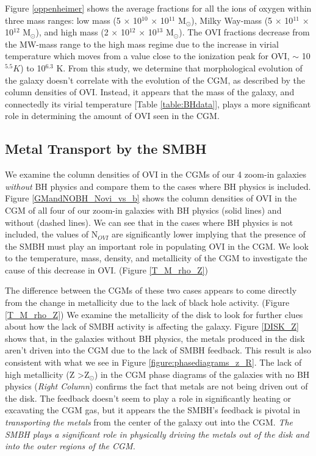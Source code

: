 \documentclass[]{emulateapj}
\begin{document}
Figure \ref{oppenheimer} shows the average fractions for all the ions of oxygen within three mass ranges: low mass (5 $\times$ 10$^{10}$  $\times$ 10$^{11}$ M$_{\odot}$), Milky Way-mass (5 $\times$ 10$^{11}$  $\times$ 10$^{12}$ M$_{\odot}$), and high mass (2 $\times$ 10$^{12}$  $\times$ 10$^{13}$ M$_{\odot}$). The OVI fractions decrease from the MW-mass range to the high mass regime due to the increase in virial temperature which moves from a value close to the ionization peak for OVI, $\sim$ 10$^{5.5} K$) to 10$^{6.3}$ K. From this study, we determine that morphological evolution of the galaxy doesn't correlate with the evolution of the CGM, as described by the column densities of OVI. Instead, it appears that the mass of the galaxy, and connectedly its virial temperature [Table \ref{table:BHdata}], plays a more significant role in determining the amount of OVI seen in the CGM.


\subsection{Metal Transport by the SMBH}
\label{Result:metalsbyBH}

We examine the column densities of OVI in the CGMs of our 4 zoom-in galaxies \textit{without} BH physics and compare them to the cases where BH physics is included. Figure \ref{GMandNOBH_Novi_vs_b} shows the column densities of OVI in the CGM of all four of our zoom-in galaxies with BH physics (solid lines) and without (dashed lines). We can see that in the cases where BH physics is not included, the values of N$_{OVI}$ are significantly lower implying that the presence of the SMBH must play an important role in populating OVI in the CGM. We look to the temperature, mass, density, and metallicity of the CGM to investigate the cause of this decrease in OVI. (Figure \ref{T_M_rho_Z})

The difference between the CGMs of these two cases appears to come directly from the change in metallicity due to the lack of black hole activity. (Figure \ref{T_M_rho_Z}) We examine the metallicity of the disk to look for further clues about how the lack of SMBH activity is affecting the galaxy. Figure \ref{DISK_Z} shows that, in the galaxies without BH physics, the metals produced in the disk aren't driven into the CGM due to the lack of SMBH feedback. This result is also consistent with what we see in Figure \ref{figure:phasediagrams_z_R}. The lack of high metallicity (Z \textgreater Z$_{\odot}$) in the CGM phase diagrams of the galaxies with no BH physics (\textit{Right Column}) confirms the fact that metals are not being driven out of the disk. The feedback doesn't seem to play a role in significantly heating or excavating the CGM gas, but it appears the the SMBH's feedback is pivotal in \textit{transporting the metals} from the center of the galaxy out into the CGM. \textit{The SMBH plays a significant role in physically driving the metals out of the disk and into the outer regions of the CGM.}
\end{document}
